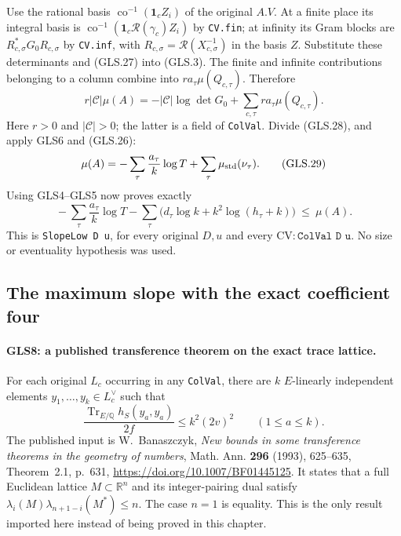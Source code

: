 Use the rational basis $\operatorname{co}^{-1}(\mathbf1_cZ_i)$
of the original $A.V$.  At a finite place its integral basis is
$\operatorname{co}^{-1}(\mathbf1_c\mathcal R(\gamma_c)Z_i)$ by
\texttt{CV.fin}; at infinity its Gram blocks are
$R_{c,\sigma}^*G_0R_{c,\sigma}$ by \texttt{CV.inf}, with
$R_{c,\sigma}=\mathcal R(X_{c,\sigma}^{-1})$ in the basis $Z$.
Substitute these determinants and (GLS.27) into (GLS.3).  The finite
and infinite contributions belonging to a column combine into
$ra_\tau\mu(Q_{c,\tau})$.  Therefore
\[
 r|\mathcal C|\mu(A)
 =-|\mathcal C|\log\det G_0+
                 \sum_{c,\tau}ra_\tau\mu(Q_{c,\tau}).
 \tag{GLS.28}
\]
Here $r>0$ and $|\mathcal C|>0$; the latter is a field of
\texttt{ColVal}.  Divide (GLS.28), and apply GLS6 and (GLS.26):
\[
 \mu(A)=-\sum_\tau\frac{a_\tau}{k}\log T
                       +\sum_\tau\mu_{\rm std}(\nu_\tau).
 \tag{GLS.29}
\]
Using GLS4--GLS5 now proves exactly
\[
 \boxed{\quad
 -\sum_\tau\frac{a_\tau}{k}\log T
 -\sum_\tau\bigl(d_\tau\log k+k^2\log(h_\tau+k)\bigr)
                  \ \le\ \mu(A).
 \quad}                                                       \tag{GLS.30}
\]
This is \texttt{SlopeLow D u}, for every original $D,u$ and every
$\mathrm{CV}:\texttt{ColVal D u}$.  No size or eventuality
hypothesis was used.

\subsection{The maximum slope with the exact coefficient four}

\paragraph{GLS8: a published transference theorem on the exact trace lattice.}
\label{claim:GLS8}
For each original $L_c$ occurring in any \texttt{ColVal}, there are
$k$ $E$-linearly independent elements $y_1,\ldots,y_k\in L_c^\vee$
such that
\[
 \frac{\operatorname{Tr}_{E/\mathbb Q}h_S(y_a,y_a)}{2f}
                    \le k^2(2v)^2 \qquad(1\le a\le k).
 \tag{GLS.31}
\]
The published input is W.~Banaszczyk, \emph{New bounds in some
transference theorems in the geometry of numbers}, Math. Ann.
\textbf{296} (1993), 625--635, Theorem~2.1, p.~631,
\url{https://doi.org/10.1007/BF01445125}.
It states that a full Euclidean lattice $M\subset\mathbb R^n$
and its integer-pairing dual satisfy
$\lambda_i(M)\lambda_{n+1-i}(M^*)\le n$.
The case $n=1$ is equality.  This is the only result imported here
instead of being proved in this chapter.

